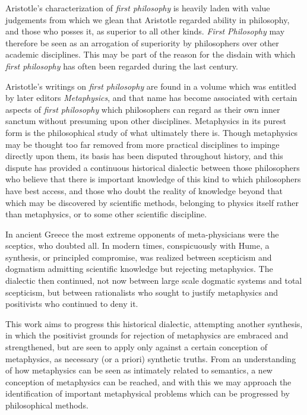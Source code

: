 Aristotle's characterization of {\it first philosophy} is heavily laden with value judgements from which we glean that Aristotle regarded ability in philosophy, and those who posses it, as superior to all other kinds.
{\it First Philosophy} may therefore be seen as an arrogation of superiority by philosophers over other academic disciplines.
This may be part of the reason for the disdain with which {\it first philosophy} has often been regarded during the last century.

Aristotle's writings on {\it first philosophy} are found in a volume which was entitled by later editors {\it Metaphysics}, and that name has become associated with certain aspects of {\it first philosophy} which philosophers can regard as their own inner sanctum without presuming upon other disciplines.
Metaphysics in its purest form is the philosophical study of what ultimately there is.
Though metaphysics may be thought too far removed from more practical disciplines to impinge directly upon them, its basis has been disputed throughout history, and this dispute has provided a continuous historical dialectic between those philosophers who believe that there is important knowledge of this kind to which philosophers have best access, and those who doubt the reality of knowledge beyond that which may be discovered by scientific methods, belonging to physics itself rather than metaphysics, or to some other scientific discipline.

In ancient Greece the most extreme opponents of meta-physicians were the sceptics, who doubted all.
In modern times, conspicuously with Hume, a synthesis, or principled compromise, was realized between scepticism and dogmatism admitting scientific knowledge but rejecting metaphysics.
The dialectic then continued, not now between large scale dogmatic systems and total scepticism, but between rationalists who sought to justify metaphysics and positivists who continued to deny it.

This work aims to progress this historical dialectic, attempting another synthesis, in which the positivist grounds for rejection of metaphysics are embraced and strengthened, but are seen to apply only against a certain conception of metaphysics, as necessary (or a priori) synthetic truths.
From an understanding of how metaphysics can be seen as intimately related to semantics, a new conception of metaphysics can be reached, and with this we may approach the identification of important metaphysical problems  which can be progressed by philosophical methods.

